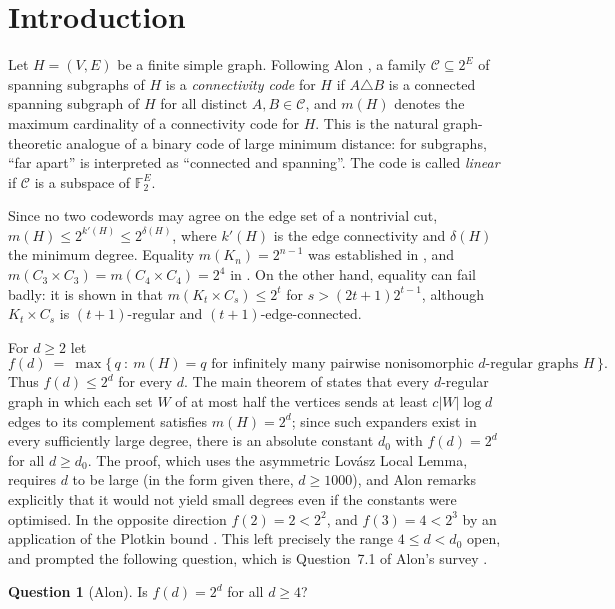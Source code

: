 \documentclass[11pt,reqno]{amsart}
\theoremstyle{plain}
\theoremstyle{definition}
\newtheorem{question}[theorem]{Question}
\newcommand{\FF}{\mathbb{F}}
\begin{document}
\section{Introduction}

Let $H=(V,E)$ be a finite simple graph. Following Alon \cite{AlonConn}, a family $\mathcal{C}\subseteq 2^{E}$ of spanning subgraphs of $H$ is a \emph{connectivity code} for $H$ if $A\triangle B$ is a connected spanning subgraph of $H$ for all distinct $A,B\in\mathcal{C}$, and $m(H)$ denotes the maximum cardinality of a connectivity code for $H$. This is the natural graph-theoretic analogue of a binary code of large minimum distance: for subgraphs, ``far apart'' is interpreted as ``connected and spanning''. The code is called \emph{linear} if $\mathcal{C}$ is a subspace of $\FF_2^{E}$.

Since no two codewords may agree on the edge set of a nontrivial cut, $m(H)\le 2^{k'(H)}\le 2^{\delta(H)}$, where $k'(H)$ is the edge connectivity and $\delta(H)$ the minimum degree. Equality $m(K_{n})=2^{n-1}$ was established in \cite{AGKMS}, and $m(C_{3}\times C_{3})=m(C_{4}\times C_{4})=2^{4}$ in \cite{BGMW}. On the other hand, equality can fail badly: it is shown in \cite{AlonConn} that $m(K_{t}\times C_{s})\le 2^{t}$ for $s>(2t+1)2^{t-1}$, although $K_{t}\times C_{s}$ is $(t+1)$-regular and $(t+1)$-edge-connected.

For $d\ge 2$ let
\[
f(d)\ =\ \max\bigl\{\,q\ :\ m(H)=q \text{ for infinitely many pairwise nonisomorphic $d$-regular graphs } H \,\bigr\}.
\]
Thus $f(d)\le 2^{d}$ for every $d$. The main theorem of \cite{AlonConn} states that every $d$-regular graph in which each set $W$ of at most half the vertices sends at least $c|W|\log d$ edges to its complement satisfies $m(H)=2^{d}$; since such expanders exist in every sufficiently large degree, there is an absolute constant $d_{0}$ with $f(d)=2^{d}$ for all $d\ge d_{0}$. The proof, which uses the asymmetric Lovász Local Lemma, requires $d$ to be large (in the form given there, $d\ge 1000$), and Alon remarks explicitly that it would not yield small degrees even if the constants were optimised. In the opposite direction $f(2)=2<2^{2}$, and $f(3)=4<2^{3}$ by an application of the Plotkin bound \cite{Plotkin}. This left precisely the range $4\le d<d_{0}$ open, and prompted the following question, which is Question~7.1 of Alon's survey \cite{AlonSurvey}.

\begin{question}[Alon]\label{q:alon}
Is $f(d)=2^{d}$ for all $d\ge 4$?
\end{question}
\end{document}
